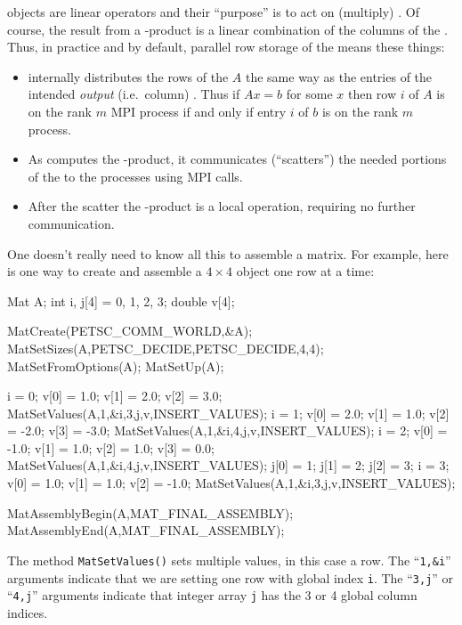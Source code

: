\pMat objects are linear operators and their ``purpose'' is to act on (multiply) \pVecs.  Of course, the result \pVec from a \pMat-\pVec product is a linear combination of the columns of the \pMat.  Thus, in practice and by default, parallel row storage of the \pMat means these things:
\begin{itemize}
\item \PETSc internally distributes the rows of the \pMat $A$ the same way as the entries of the intended \emph{output} (i.e.~column) \pVec.  Thus if $Ax=b$ for some $x$ then row $i$ of $A$ is on the rank $m$ MPI process if and only if entry $i$ of $b$ is on the rank $m$ process.
\item As \PETSc computes the \pMat-\pVec product, it communicates (``scatters'') the needed portions of the \pVec to the processes using MPI calls.
\item After the scatter the \pMat-\pVec product is a local operation, requiring no further communication.
\end{itemize}

One doesn't really need to know all this to assemble a matrix.  For example, here is one way to create and assemble a $4\times 4$ \pMat object one row at a time:
\begin{code}
Mat    A;
int    i, j[4] = {0, 1, 2, 3};
double v[4];

MatCreate(PETSC_COMM_WORLD,&A);
MatSetSizes(A,PETSC_DECIDE,PETSC_DECIDE,4,4);
MatSetFromOptions(A);
MatSetUp(A);

i = 0;  v[0] = 1.0;  v[1] = 2.0;  v[2] = 3.0;
MatSetValues(A,1,&i,3,j,v,INSERT_VALUES);
i = 1;  v[0] = 2.0;  v[1] = 1.0;  v[2] = -2.0;  v[3] = -3.0;
MatSetValues(A,1,&i,4,j,v,INSERT_VALUES);
i = 2;  v[0] = -1.0;  v[1] = 1.0;  v[2] = 1.0;  v[3] = 0.0;
MatSetValues(A,1,&i,4,j,v,INSERT_VALUES);
j[0] = 1;  j[1] = 2;  j[2] = 3;
i = 3;  v[0] = 1.0;  v[1] = 1.0;  v[2] = -1.0;
MatSetValues(A,1,&i,3,j,v,INSERT_VALUES);

MatAssemblyBegin(A,MAT_FINAL_ASSEMBLY);
MatAssemblyEnd(A,MAT_FINAL_ASSEMBLY);
\end{code}
The method \texttt{MatSetValues()} sets multiple values, in this case a row.  The ``\texttt{1,\&i}'' arguments indicate that we are setting one row with global index \texttt{i}.  The ``\texttt{3,j}'' or ``\texttt{4,j}'' arguments indicate that integer array \texttt{j} has the 3 or 4 global column indices.

